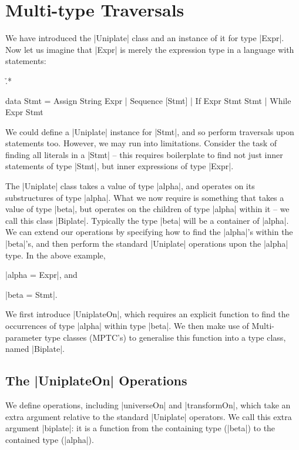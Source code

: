 \section{Multi-type Traversals}
\label{secU:use_playex}

We have introduced the |Uniplate| class and an instance of it for type |Expr|. Now let us imagine that |Expr| is merely the expression type in a language with statements:

\begin{onepage}
\h{.*}\begin{code}
data Stmt  =  Assign    String  Expr
           |  Sequence  [Stmt]
           |  If        Expr    Stmt Stmt
           |  While     Expr    Stmt
\end{code}
\end{onepage}

We could define a |Uniplate| instance for |Stmt|, and so perform traversals upon statements too. However, we may run into limitations. Consider the task of finding all literals in a |Stmt| -- this requires boilerplate to find not just inner statements of type |Stmt|, but inner expressions of type |Expr|.

The |Uniplate| class takes a value of type |alpha|, and operates on its substructures of type |alpha|. What we now require is something that takes a value of type |beta|, but operates on the children of type |alpha| within it -- we call this class |Biplate|. Typically the type |beta| will be a container of |alpha|. We can extend our operations by specifying how to find the |alpha|'s within the |beta|'s, and then perform the standard |Uniplate| operations upon the |alpha| type. In the above example, \ignore|alpha = Expr|, and \ignore|beta = Stmt|.

We first introduce |UniplateOn|, which requires an explicit function to find the occurrences of  type |alpha| within type |beta|. We then make use of Multi-parameter type classes (MPTC's) to generalise this function into a type class, named |Biplate|.

\subsection{The |UniplateOn| Operations}

We define operations, including |universeOn| and |transformOn|, which take an extra argument relative to the standard |Uniplate| operators. We call this extra argument |biplate|: it is a function from the containing type (|beta|) to the contained type (|alpha|).

